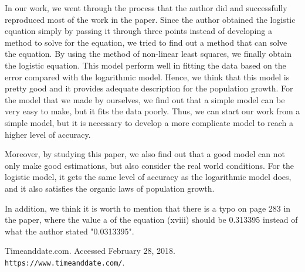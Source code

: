 \documentclass[a4paper]{article}
\begin{document}
In our work, we went through the process that the author did and successfully reproduced most of the work in the paper. Since the author obtained the logistic equation simply by passing it through three points instead of developing a method to solve for the equation, we tried to find out a method that can solve the equation. By using the method of non-linear least squares, we finally obtain the logistic equation. This model perform well in fitting the data based on the error compared with the logarithmic model. Hence, we think that this model is pretty good and it provides adequate description for the population growth. For the model that we made by ourselves, we find out that a simple model can be very easy to make, but it fits the data poorly. Thus, we can start our work from a simple model, but it is necessary to develop a more complicate model to reach a higher level of accuracy.\

Moreover, by studying this paper, we also find out that a good model can not only make good estimations, but also consider the real world conditions. For the logistic model, it gets the same level of accuracy as the logarithmic model does, and it also satisfies the organic laws of population growth. \

In addition, we think it is worth to mention that there is a typo on page 283 in the paper, where the value a of the equation (xviii) should be 0.313395 instead of what the author stated "0.0313395". \\

\vspace{\fill}

\begin{thebibliography}{9}

Timeanddate.com. Accessed February 28, 2018.  \\
\texttt{https://www.timeanddate.com/}. \\

\end{thebibliography}
\end{document}
